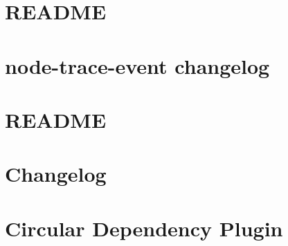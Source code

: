 \documentclass[twoside]{book}
\newcommand{\+}{\discretionary{\mbox{\scriptsize$\hookleftarrow$}}{}{}}
\begin{document}
\chapter{README}
\label{md__c___users_vaishnavi_jadhav__desktop__developer_code_mean_stack_example_client_node_modules_chownr__r_e_a_d_m_e}

\chapter{node-\/trace-\/event changelog}
\label{md__c___users_vaishnavi_jadhav__desktop__developer_code_mean_stack_example_client_node_modules_c30326177f41690587d3e9509a047055f}

\chapter{README}
\label{md__c___users_vaishnavi_jadhav__desktop__developer_code_mean_stack_example_client_node_modules_chrome_trace_event__r_e_a_d_m_e}

\chapter{Changelog}
\label{md__c___users_vaishnavi_jadhav__desktop__developer_code_mean_stack_example_client_node_modules_ca32ddfc5fe04046f84c64bd6199ab0b5}

\chapter{Circular Dependency Plugin}
\label{md__c___users_vaishnavi_jadhav__desktop__developer_code_mean_stack_example_client_node_modules_cffe83c8ee709f5061c1ad83b7f4e73f3}

\end{document}
